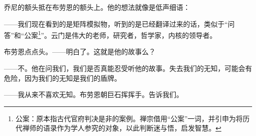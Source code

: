 \documentclass[AutoFakeBold=true]{book}
\begin{document}
{}

乔尼的额头抵在布劳恩的额头上。他的想法就像是低声细语：

{\kaishu ——我们现在看到的是矩阵模拟物，听到的是已经翻译过来的话，类似于``问答''和``公案\footnote{公案：原本指古代官府判决是非的案例。禅宗借用``公案''一词，并引申为将历代禅师的语录作为学人参究的对象，以此判断迷与悟，启发智慧。}''。云门是伟大的老师，研究者，哲学家，内核的领导者。}

布劳恩点点头。{\kaishu ——明白了。这就是他的故事么？}

{\kaishu ——不。他在问我们，我们是否真能忍受听他的故事。失去我们的无知，可能会有危险，因为我们的无知是我们的盾牌。}

{\kaishu ——我从来不喜欢无知。}布劳恩朝巨石挥挥手。{\kaishu 告诉我们。}

\vspace*{1em}

{}

\vspace*{1em}

{}

\vspace*{1em}
\end{document}
